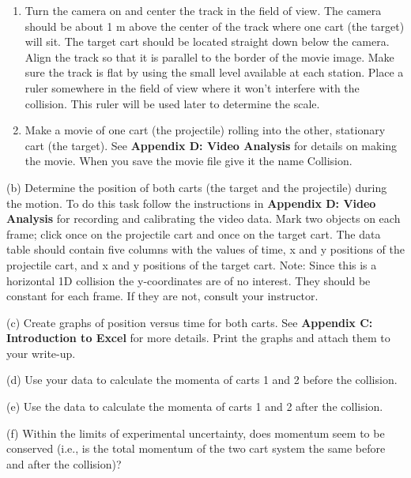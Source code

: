 \begin{enumerate}
\item Turn the camera on and center the track in the field of view. The camera should
be about 1 m above the center of the track where one cart (the target) will
sit. The target cart should be located straight down below the camera. Align the track so that it is parallel to the border of the movie image. Make sure the track is flat by using the small level available at each station. Place a ruler somewhere in the field of view where it won't interfere with the collision. This ruler will be used later to determine the scale. 
\item Make a movie of one cart (the projectile) rolling into the other, stationary
cart (the target). See \textbf{Appendix D: Video Analysis} for details on making
the movie. When you save the movie file give it the name Collision.
\end{enumerate}
(b) Determine the position of both carts (the target and the projectile) during
the motion. To do this task follow the instructions in \textbf{Appendix D: Video
Analysis} for recording and calibrating the video data. Mark two objects on
each frame; click once on the projectile cart and once on the target cart. The
data table should contain five columns with the values of time, x and y positions
of the projectile cart, and x and y positions of the target cart. Note: Since
this is a horizontal 1D collision the y-coordinates are of no interest. They
should be constant for each frame. If they are not, consult your instructor.

(c) Create graphs of position versus time for both carts. See \textbf{Appendix
C: Introduction to Excel} for more details. Print the graphs and attach
them to your write-up. 

(d) Use your data to calculate the momenta of carts 1 and 2 before the collision.
\vspace{30mm}

(e) Use the data to calculate the momenta of carts 1 and 2 after the collision.
\vspace{30mm}

(f) Within the limits of experimental uncertainty, does momentum seem to be
conserved (i.e., is the total momentum of the two cart system the same before
and after the collision)?

